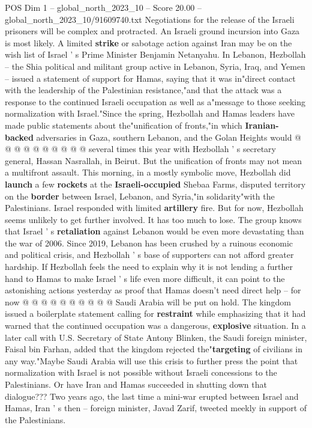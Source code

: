 \begin{textsample}{POS Dim 1 – global\_north\_2023\_10 – Score 20.00 – global\_north\_2023\_10/91609740.txt}
Negotiations for the release of the Israeli prisoners will be complex and protracted.
An Israeli ground incursion into Gaza is most likely.
A limited \textbf{strike} or sabotage action against Iran may be on the wish list of Israel ' s Prime Minister Benjamin Netanyahu.
In Lebanon, Hezbollah -- the Shia political and militant group active in Lebanon, Syria, Iraq, and Yemen -- issued a statement of support for Hamas, saying that it was in"direct contact with the leadership of the Palestinian resistance,"and that the attack was a response to the continued Israeli occupation as well as a"message to those seeking normalization with Israel."Since the spring, Hezbollah and Hamas leaders have made public statements about the"unification of fronts,"in which \textbf{Iranian-backed} adversaries in Gaza, southern Lebanon, and the Golan Heights would @ @ @ @ @ @ @ @ @ @ several times this year with Hezbollah ' s secretary general, Hassan Nasrallah, in Beirut.
But the unification of fronts may not mean a multifront assault.
This morning, in a mostly symbolic move, Hezbollah did \textbf{launch} a few \textbf{rockets} at the \textbf{Israeli-occupied} Shebaa Farms, disputed territory on the \textbf{border} between Israel, Lebanon, and Syria,"in solidarity"with the Palestinians.
Israel responded with limited \textbf{artillery} fire.
But for now, Hezbollah seems unlikely to get further involved.
It has too much to lose.
The group knows that Israel ' s \textbf{retaliation} against Lebanon would be even more devastating than the war of 2006.
Since 2019, Lebanon has been crushed by a ruinous economic and political crisis, and Hezbollah ' s base of supporters can not afford greater hardship.
If Hezbollah feels the need to explain why it is not lending a further hand to Hamas to make Israel ' s life even more difficult, it can point to the astonishing actions yesterday as proof that Hamas doesn't need direct help -- for now @ @ @ @ @ @ @ @ @ @ Saudi Arabia will be put on hold.
The kingdom issued a boilerplate statement calling for \textbf{restraint} while emphasizing that it had warned that the continued occupation was a dangerous, \textbf{explosive} situation.
In a later call with U.S.
Secretary of State Antony Blinken, the Saudi foreign minister, Faisal bin Farhan, added that the kingdom rejected the"\textbf{targeting} of civilians in any way."Maybe Saudi Arabia will use this crisis to further press the point that normalization with Israel is not possible without Israeli concessions to the Palestinians.
Or have Iran and Hamas succeeded in shutting down that dialogue???
Two years ago, the last time a mini-war erupted between Israel and Hamas, Iran ' s then -- foreign minister, Javad Zarif, tweeted meekly in support of the Palestinians.

\end{textsample}
